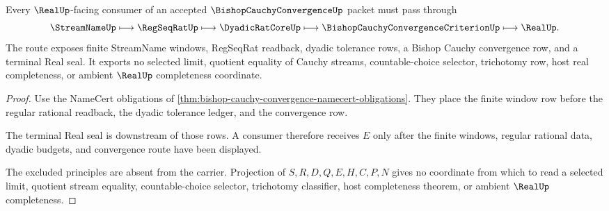 \begin{theorem}
\label{thm:bishop-cauchy-convergence-regseqrat-real-route}
Every $\RealUp$-facing consumer of an accepted $\BishopCauchyConvergenceUp$ packet must pass through
$$
\StreamNameUp \longmapsto \RegSeqRatUp \longmapsto \DyadicRatCoreUp \longmapsto \BishopCauchyConvergenceCriterionUp \longmapsto \RealUp .
$$
The route exposes finite StreamName windows, RegSeqRat readback, dyadic tolerance rows, a Bishop Cauchy convergence row, and a terminal Real seal. It exports no selected limit, quotient equality of Cauchy streams, countable-choice selector, trichotomy row, host real completeness, or ambient $\RealUp$ completeness coordinate.
\end{theorem}
\begin{proof}
Use the NameCert obligations of \autoref{thm:bishop-cauchy-convergence-namecert-obligations}. They place the finite window row before the regular rational readback, the dyadic tolerance ledger, and the convergence row.

The terminal Real seal is downstream of those rows. A consumer therefore receives $E$ only after the finite windows, regular rational data, dyadic budgets, and convergence route have been displayed.

The excluded principles are absent from the carrier. Projection of $S,R,D,Q,E,H,C,P,N$ gives no coordinate from which to read a selected limit, quotient stream equality, countable-choice selector, trichotomy classifier, host completeness theorem, or ambient $\RealUp$ completeness.
\end{proof}




